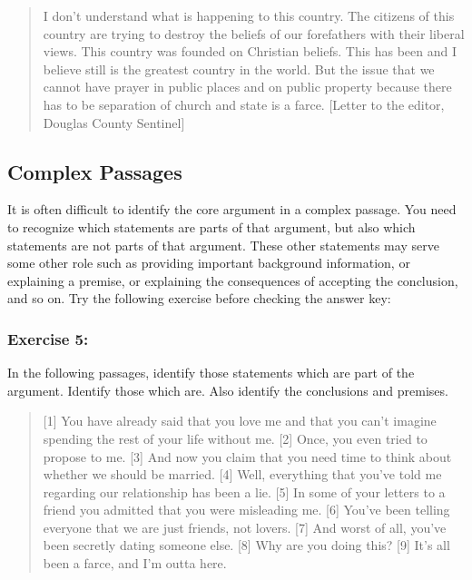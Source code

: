 \documentclass[]{article}
\begin{document}
\begin{quote}
I don't understand what is happening to this country. The citizens of
this country are trying to destroy the beliefs of our forefathers with
their liberal views. This country was founded on Christian beliefs. This
has been and I believe still is the greatest country in the world. But
the issue that we cannot have prayer in public places and on public
property because there has to be separation of church and state is a
farce. {[}Letter to the editor, Douglas County Sentinel{]}
\end{quote}

\subsection{Complex Passages}\label{complex-passages}

It is often difficult to identify the core argument in a complex
passage. You need to recognize which statements are parts of that
argument, but also which statements are not parts of that argument.
These other statements may serve some other role such as providing
important background information, or explaining a premise, or explaining
the consequences of accepting the conclusion, and so on. Try the
following exercise before checking the answer key:

\subsubsection{Exercise 5:}\label{exercise-5}

In the following passages, identify those statements which are part of
the argument. Identify those which are. Also identify the conclusions
and premises.

\begin{quote}
{[}1{]} You have already said that you love me and that you can't
imagine spending the rest of your life without me. {[}2{]} Once, you
even tried to propose to me. {[}3{]} And now you claim that you need
time to think about whether we should be married. {[}4{]} Well,
everything that you've told me regarding our relationship has been a
lie. {[}5{]} In some of your letters to a friend you admitted that you
were misleading me. {[}6{]} You've been telling everyone that we are
just friends, not lovers. {[}7{]} And worst of all, you've been secretly
dating someone else. {[}8{]} Why are you doing this? {[}9{]} It's all
been a farce, and I'm outta here.
\end{quote}
\end{document}
